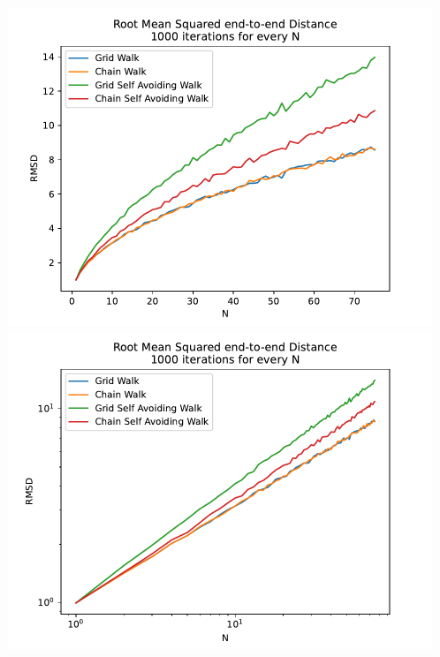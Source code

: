 \documentclass[a4paper,12pt]{article}
\begin{document}
\begin{figure}[!ht]
  \centering
  \begin{minipage}{0.49\textwidth}
    \includegraphics[width=\textwidth]{img/4-rmsd-comparison.pdf}
  \end{minipage}
  \begin{minipage}{0.49\textwidth}
    \includegraphics[width=\textwidth]{img/4-rmsd-comparison-loglog.pdf}
  \end{minipage}
\end{figure}
\end{document}
